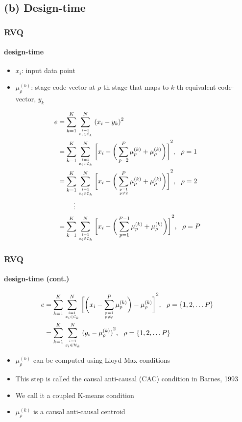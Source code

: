 \subsection{(b) Design-time}
\begin{frame}
\frametitle{RVQ}
\framesubtitle{design-time}
\logoCSIPCPL\mypagenum
\begin{itemize}
\item $x_i$: input data point
\item $\mu_\rho^{(k)}$: stage code-vector at $\rho$-th stage that maps to $k$-th equivalent code-vector, $y_k$
\end{itemize}
\scriptsize
\begin{align}
e &= \KmeansError\notag\\
&= \KmeansSum{\bigg[\RVQmultipleKmeansone\bigg]}^2, \ \ \rho=1\notag\\
&= \KmeansSum{\bigg[\RVQmultipleKmeanstwo\bigg]}^2, \ \ \rho=2\notag\\
&\ \ \ \  \ \ \ \vdots\notag\\
&=\KmeansSum{\bigg[\RVQmultipleKmeansT\bigg]}^2, \ \ \rho=P\notag
\end{align}
\end{frame}


\begin{frame}
\frametitle{RVQ}
\framesubtitle{design-time (cont.)}
\logoCSIPCPL\mypagenum
\scriptsize
\begin{align*}
e	&= \KmeansSum{\bigg[\RVQmultipleKmeansonealternate\bigg]}^2, \ \ \rho=\{1, 2, \ldots P\}\notag\\
&={\RVQerroralternate}, \ \ \rho=\{1, 2, \ldots P\}
\end{align*}
\vspace{0.1in}
\normalsize
\begin{itemize}
\item $\mu_\rho^{(k)}$ can be computed using Lloyd Max conditions
\item This step is called the causal anti-causal (CAC) condition in Barnes, 1993
\item We call it a coupled K-means condition
\item $\mu_\rho^{(k)}$ is a causal anti-causal centroid
\end{itemize}
\end{frame}


